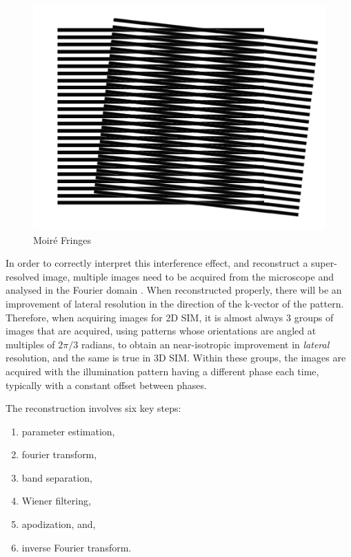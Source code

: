 \documentclass[12pt]{article}
\begin{document}
\begin{figure}[hbt]
    \includegraphics[scale=0.5]{figures/moire.png}
    \caption{Moir\'{e} Fringes}
    \label{fig:moire}
\end{figure}

In order to correctly interpret this interference effect, and reconstruct a super-resolved image,
multiple images need to be acquired from the microscope and analysed in the Fourier domain \cite{originalSIM}.
When reconstructed properly, there will be an improvement of lateral resolution in the direction of the k-vector of the pattern.
Therefore, when acquiring images for 2D SIM, it is almost always 3 groups of images that are acquired,
using patterns whose orientations are angled at multiples of $2\pi/3$ radians,
to obtain an near-isotropic improvement in \textit{lateral} resolution,
and the same is true in 3D SIM.
Within these groups, the images are acquired with the illumination pattern having a different phase each time,
typically with a constant offset between phases.

The reconstruction involves six key steps:

\begin{enumerate}
    \item parameter estimation,
    \item fourier transform,
    \item band separation,
    \item Wiener filtering,
    \item apodization, and,
    \item inverse Fourier transform.
\end{enumerate}
\end{document}
